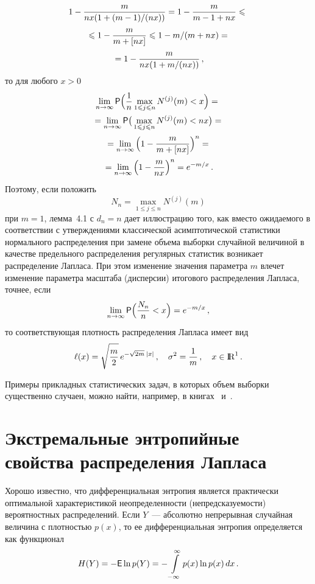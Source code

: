 \begin{multicols}{2}
\noindent
\begin{multline*}
1-\displaystyle\frac{\displaystyle m\mathstrut}{\displaystyle nx(1+(m-1)/(nx))\mathstrut}=
1-\displaystyle\frac{\displaystyle m\mathstrut}{\displaystyle m-1+nx\mathstrut}\leqslant{}\\
{}\leqslant  1-\displaystyle\frac{\displaystyle m\mathstrut}{\displaystyle m+[nx]\mathstrut}\leqslant 1-m/(m+nx)={}\\
{}= 1-\displaystyle\frac{\displaystyle m\mathstrut}{\displaystyle nx(1+m/(nx))\mathstrut}\,,
\end{multline*}
то для любого $x>0$
\begin{multline*}
\lim_{n\to\infty}{\sf P}\Big(\displaystyle\frac{\displaystyle 1\mathstrut}{\displaystyle n\mathstrut}\max_{1\leqslant j\leqslant
n}N^{(j)}(m)<x\Big)={}\\
{}= \lim_{n\to\infty}{\sf P}\big(\max_{1\leqslant j\leqslant
n}N^{(j)}(m)<nx\big)= {}\\
{}=\lim_{n\to\infty}\Big(1-\displaystyle\frac{\displaystyle m\mathstrut}{\displaystyle m+[nx]\mathstrut}\Big)^n={}\\
{}=\lim_{n\to\infty}\Big(1-
\displaystyle\frac{\displaystyle m\mathstrut}{\displaystyle nx\mathstrut}\Big)^n=e^{-m/x}\,.
\end{multline*}
Поэтому, если положить
$$
N_n=\max_{1\le j\le n}N^{(j)}(m)
$$
при $m=1$, лемма~4.1 с
$d_n=n$ дает иллюстрацию того, как вместо ожидаемого в
соответствии с утверждениями классической асимптотической
статистики нормального распределения при замене объема выборки
случайной величиной в качестве предельного распределения
регулярных статистик возникает распределение Лапласа. При этом
изменение значения параметра $m$ влечет изменение параметра
масштаба (дисперсии) итогового распределения Лапласа, точнее, если
\begin{equation}
\lim_{n\to\infty}{\sf P}\Big(\displaystyle\frac{\displaystyle N_n\mathstrut}{\displaystyle n\mathstrut}<x\Big)=
e^{-m/x}\,, \label{4.5b}
\end{equation}
то соответствующая плотность
распределения Лап\-ла\-са имеет вид
\begin{equation}
\ell(x)=\sqrt{\displaystyle\frac{\displaystyle m\mathstrut}{\displaystyle 2\mathstrut}}\,e^{-\sqrt{2m}\:|x|}\,,\quad \sigma^2=\displaystyle\frac{\displaystyle 1\mathstrut}{\displaystyle m\mathstrut}\,,
\quad x\in{\rm I\hspace{-0.7mm}\rm R}^1\,.
\label{4.6b}
\end{equation}

Примеры прикладных статистических задач, в которых объем выборки
существенно случаен, можно найти, например, в книгах~\cite{12be} и~\cite{3be}.

\section{Экстремальные энтропийные свойства распределения Лапласа}

Хорошо известно, что дифференциальная энт\-ро\-пия является
практически оптимальной характеристикой неопределенности
(не\-пред\-ска\-зу\-емости) вероятностных распределений. Если $Y$~---
абсолютно непрерывная случайная величина с плотностью $p(x)$, то
ее дифференциальная энтропия определяется как функционал
$$
H(Y)=-{\sf E}\ln p(Y)=-\int\limits_{-\infty}^{\infty}p(x)\ln
p(x)\,dx\,.
$$


\end{multicols}
